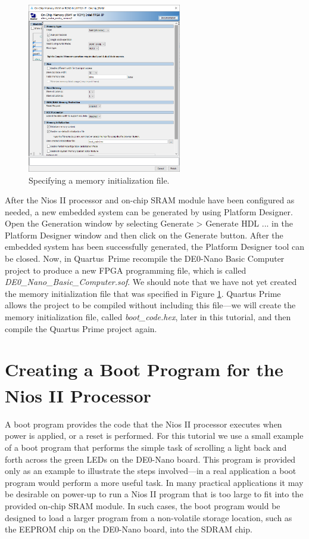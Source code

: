 \documentclass[11pt, twoside, pdftex]{article}
\begin{document}
\newpage
\begin{figure}[H]
   \begin{center}
        \includegraphics[width=0.6\textwidth]{figures/onchip_memory.png}
   \end{center}
   \caption{Specifying a memory initialization file.}
	\label{fig:onchip_memory}
\end{figure}

After the Nios II processor and on-chip SRAM module have been configured as needed,
a new embedded system can be generated by using Platform Designer. Open the {\sf Generation} window by selecting {\sf Generate > Generate HDL ...} in 
the Platform Designer window and then click on the {\sf Generate} button. 
After the embedded system has been successfully generated, the Platform Designer tool can be closed.
Now, in Quartus~Prime recompile the DE0-Nano Basic Computer project to produce a new FPGA 
programming file, which is called {\it DE0\_Nano\_Basic\_Computer.sof}. We should note
that we have not yet created the memory initialization file that 
was specified in Figure \ref{fig:onchip_memory}. Quartus Prime allows the project to be 
compiled without including this file---we will create the memory initialization file,
called {\it boot\_code.hex}, later in this tutorial, and then compile the Quartus 
Prime project again.

\section{Creating a Boot Program for the Nios\textsuperscript{\textregistered} II Processor}

A boot program provides the code that the Nios II processor executes when power is
applied, or a reset is performed. For this tutorial we use a small
example of a boot program that performs the simple task of scrolling a light back and
forth across the green LEDs on the DE0-Nano board. This program is provided only as an
example to illustrate the steps involved---in a real application a boot program would perform a
more useful task.  In many practical applications it may be desirable on power-up to 
run a Nios II program that is too large to fit into the provided on-chip SRAM module. In 
such cases, the boot program would be designed to load a larger program from a non-volatile
storage location, such as the EEPROM chip on the DE0-Nano board, into the SDRAM chip.
\end{document}
